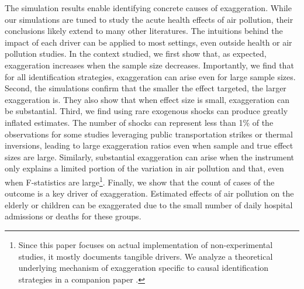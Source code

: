 \documentclass[12pt]{article}
\begin{document}
		The simulation results enable identifying concrete causes of exaggeration. While our simulations are tuned to study the acute health effects of air pollution, their conclusions likely extend to many other literatures. The intuitions behind the impact of each driver can be applied to most settings, even outside health or air pollution studies. In the context studied, we first show that, as expected, exaggeration increases when the sample size decreases. Importantly, we find that for all identification strategies, exaggeration can arise even for large sample sizes. Second, the simulations confirm that the smaller the effect targeted, the larger exaggeration is. They also show that when effect size is small, exaggeration can be substantial. Third, we find using rare exogenous shocks can produce greatly inflated estimates. The number of shocks can represent less than 1\% of the observations for some studies leveraging public transportation strikes or thermal inversions, leading to large exaggeration ratios even when sample and true effect sizes are large. Similarly, substantial exaggeration can arise when the instrument only explains a limited portion of the variation in air pollution and that, even when F-statistics are large\footnote{Since this paper focuses on actual implementation of non-experimental studies, it mostly documents tangible drivers. We analyze a theoretical underlying mechanism of exaggeration specific to causal identification strategies in a companion paper \citep{bagilet_causal_2023}.}. Finally, we show that the count of cases of the outcome is a key driver of exaggeration. Estimated effects of air pollution on the elderly or children can be exaggerated due to the small number of daily hospital admissions or deaths for these groups.
		
		 
\end{document}
